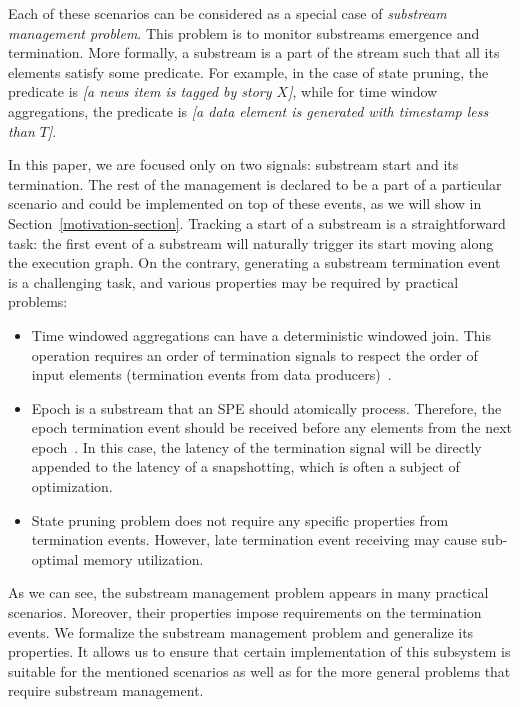 Each of these scenarios can be considered as a special case of {\em substream management problem}. This problem is to monitor substreams emergence and termination. More formally, a substream is a part of the stream such that all its elements satisfy some predicate. For example, in the case of state pruning, the predicate is {\em [a news item is tagged by story $X$]}, while for time window aggregations, the predicate is {\em [a data element is generated with timestamp less than $T$]}. 

In this paper, we are focused only on two signals: substream start and its termination. The rest of the management is declared to be a part of a particular scenario and could be implemented on top of these events, as we will show in Section~\ref{motivation-section}. Tracking a start of a substream is a straightforward task: the first event of a substream will naturally trigger its start moving along the execution graph. On the contrary, generating a substream termination event is a challenging task, and various properties may be required by practical problems:
\begin{itemize}
    \item Time windowed aggregations can have a deterministic windowed join. This operation requires an order of termination signals to respect the order of input elements (termination events from data producers)~\cite{najdataei2019stretch, gulisano2016scalejoin}.
    \item Epoch is a substream that an SPE should atomically process. Therefore, the epoch termination event should be received before any elements from the next epoch~\cite{2015arXiv150608603C}. In this case, the latency of the termination signal will be directly appended to the latency of a snapshotting, which is often a subject of optimization.
    \item State pruning problem does not require any specific properties from termination events. However, late termination event receiving may cause sub-optimal memory utilization.
\end{itemize}

As we can see, the substream management problem appears in many practical scenarios. Moreover, their properties impose requirements on the termination events. We formalize the substream management problem and generalize its properties. It allows us to ensure that certain implementation of this subsystem is suitable for the mentioned scenarios as well as for the more general problems that require substream management.

